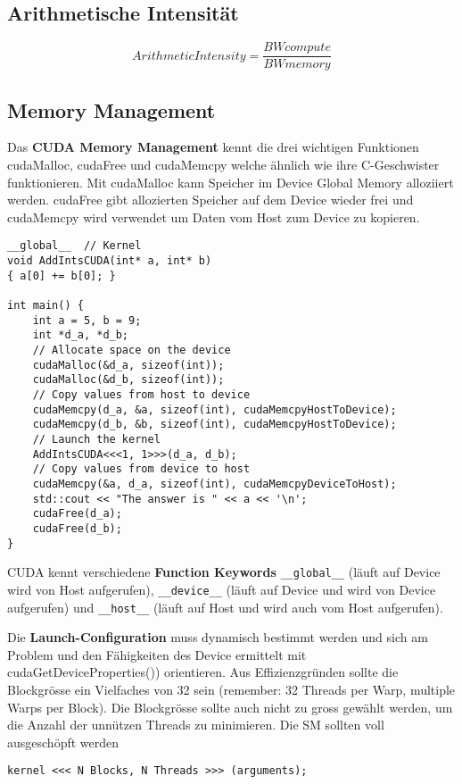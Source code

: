 \subsection{Arithmetische Intensität}
\[ ArithmeticIntensity = \frac{BWcompute}{BWmemory} \]


\subsection{Memory Management}
Das \textbf{CUDA Memory Management} kennt die drei wichtigen Funktionen cudaMalloc, cudaFree und cudaMemcpy welche ähnlich wie ihre C-Geschwister funktionieren. Mit cudaMalloc kann Speicher im Device Global Memory alloziiert werden. cudaFree gibt allozierten Speicher auf dem Device wieder frei und cudaMemcpy wird verwendet um Daten vom Host zum Device zu kopieren.

\begin{lstlisting}[style=csharp]
__global__  // Kernel
void AddIntsCUDA(int* a, int* b) 
{ a[0] += b[0]; }

int main() {
    int a = 5, b = 9;
    int *d_a, *d_b;
    // Allocate space on the device
    cudaMalloc(&d_a, sizeof(int));
    cudaMalloc(&d_b, sizeof(int));
    // Copy values from host to device
    cudaMemcpy(d_a, &a, sizeof(int), cudaMemcpyHostToDevice);
    cudaMemcpy(d_b, &b, sizeof(int), cudaMemcpyHostToDevice);
    // Launch the kernel
    AddIntsCUDA<<<1, 1>>>(d_a, d_b);
    // Copy values from device to host
    cudaMemcpy(&a, d_a, sizeof(int), cudaMemcpyDeviceToHost);
    std::cout << "The answer is " << a << '\n';
    cudaFree(d_a);
    cudaFree(d_b);
}
\end{lstlisting}

CUDA kennt verschiedene \textbf{Function Keywords} \lstinline|__global__| (läuft auf Device wird von Host aufgerufen), \lstinline|__device__| (läuft auf Device und wird von Device aufgerufen) und \lstinline|__host__| (läuft auf Host und wird auch vom Host aufgerufen).

Die \textbf{Launch-Configuration} muss dynamisch bestimmt werden und sich am Problem und den Fähigkeiten des Device ermittelt mit cudaGetDeviceProperties()) orientieren. Aus Effizienzgründen sollte die Blockgrösse ein Vielfaches von 32 sein (remember: 32 Threads per Warp, multiple Warps per Block). Die Blockgrösse sollte auch nicht zu gross gewählt werden, um die Anzahl der unnützen Threads zu minimieren. Die SM sollten voll ausgeschöpft werden

\begin{lstlisting}[style=csharp]
kernel <<< N Blocks, N Threads >>> (arguments);
\end{lstlisting}

